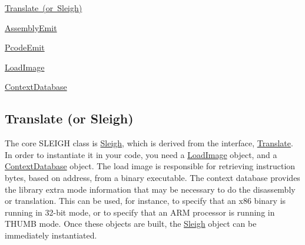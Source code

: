 \begin{DoxyItemize}
\item \mbox{\hyperlink{sleigh_a_p_ibasic_sleightranslate}{Translate (or Sleigh)}}
\item \mbox{\hyperlink{sleigh_a_p_ibasic_sleighassememit}{Assembly\+Emit}}
\item \mbox{\hyperlink{sleigh_a_p_ibasic_sleighpcodeemit}{Pcode\+Emit}}
\item \mbox{\hyperlink{sleigh_a_p_ibasic_sleighloadimage}{Load\+Image}}
\item \mbox{\hyperlink{sleigh_a_p_ibasic_sleighcontext}{Context\+Database}}
\end{DoxyItemize}\hypertarget{sleigh_a_p_ibasic_sleightranslate}{}\subsection{Translate (or Sleigh)}\label{sleigh_a_p_ibasic_sleightranslate}
The core S\+L\+E\+I\+GH class is \mbox{\hyperlink{class_sleigh}{Sleigh}}, which is derived from the interface, \mbox{\hyperlink{class_translate}{Translate}}. In order to instantiate it in your code, you need a \mbox{\hyperlink{class_load_image}{Load\+Image}} object, and a \mbox{\hyperlink{class_context_database}{Context\+Database}} object. The load image is responsible for retrieving instruction bytes, based on address, from a binary executable. The context database provides the library extra mode information that may be necessary to do the disassembly or translation. This can be used, for instance, to specify that an x86 binary is running in 32-\/bit mode, or to specify that an A\+RM processor is running in T\+H\+U\+MB mode. Once these objects are built, the \mbox{\hyperlink{class_sleigh}{Sleigh}} object can be immediately instantiated.


\begin{DoxyCode}{0}
\DoxyCodeLine{}
\DoxyCodeLine{\textcolor{comment}{// Set up the loadimage}}
\DoxyCodeLine{\textcolor{comment}{// Providing an executable name and architecture}}
\DoxyCodeLine{}
\DoxyCodeLine{}
\DoxyCodeLine{}
\end{DoxyCode}


